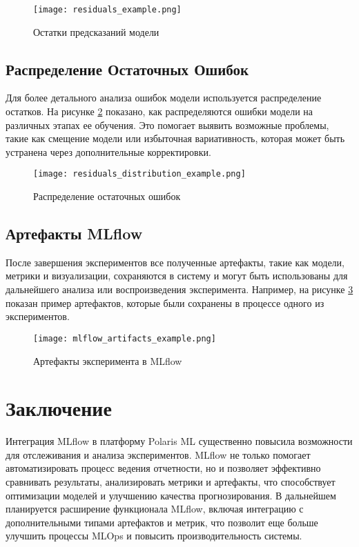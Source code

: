 \documentclass[14pt, a4paper]{src/bsu}
\begin{document}
\begin{figure}[h!] \centering
	\texttt{[image: residuals\_example.png]}
	\caption{Остатки предсказаний модели} \label{fig:residuals}
\end{figure}

\subsection{Распределение Остаточных Ошибок}

Для более детального анализа ошибок модели используется
распределение остатков. На рисунке \ref{fig:residuals_distribution}
показано, как распределяются ошибки модели на различных этапах ее
обучения. Это помогает выявить возможные проблемы, такие как
смещение модели или избыточная вариативность, которая может быть
устранена через дополнительные корректировки.

\begin{figure}[h!] \centering
	\texttt{[image: residuals\_distribution\_example.png]}
	\caption{Распределение остаточных ошибок}
	\label{fig:residuals_distribution} \end{figure}

\subsection{Артефакты MLflow}

После завершения экспериментов все полученные артефакты, такие как
модели, метрики и визуализации, сохраняются в систему и могут быть
использованы для дальнейшего анализа или воспроизведения
эксперимента. Например, на рисунке \ref{fig:mlflow_artifacts}
показан пример артефактов, которые были сохранены в процессе одного
из экспериментов.

\begin{figure}[h!] \centering
	\texttt{[image: mlflow\_artifacts\_example.png]}
	\caption{Артефакты эксперимента в MLflow}
	\label{fig:mlflow_artifacts} \end{figure}

\section{Заключение}

Интеграция MLflow в платформу Polaris ML существенно повысила
возможности для отслеживания и анализа экспериментов. MLflow не
только помогает автоматизировать процесс ведения отчетности, но и
позволяет эффективно сравнивать результаты, анализировать метрики и
артефакты, что способствует оптимизации моделей и улучшению
качества прогнозирования. В дальнейшем планируется расширение
функционала MLflow, включая интеграцию с дополнительными типами
артефактов и метрик, что позволит еще больше улучшить процессы
MLOps и повысить производительность системы.
\end{document}
